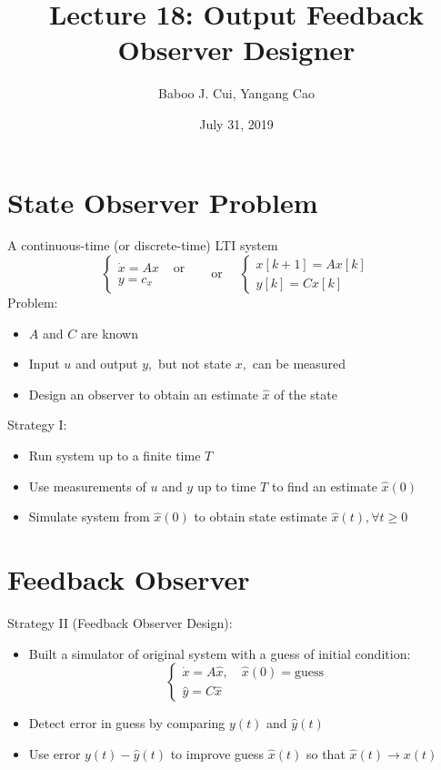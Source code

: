 \documentclass[10pt,a4paper,oneside]{article}
\date{July 31, 2019}
\author{Baboo J. Cui, Yangang Cao}
\title{Lecture 18: Output Feedback Observer Designer}
\begin{document}
\maketitle
\tableofcontents
\newpage
\section{State Observer Problem}
A continuous-time (or discrete-time) LTI system
\[
\left\{\begin{array}{ll}{\dot{x}=A x} & {\text { or }} \\ {y=c_{x}}\end{array} \quad \text { or } \quad\left\{\begin{array}{l}{x[k+1]=A x[k]} \\ {y[k]=C x[k]}\end{array}\right.\right.
\]
Problem:
\begin{itemize}
\item $A$ and $C$ are known
\item Input $u$ and output $y,$ but not state $x,$ can be measured
\item Design an observer to obtain an estimate $\hat{x}$ of the state
\end{itemize}
Strategy I:
\begin{itemize}
\item Run system up to a finite time $T$
\item Use measurements of $u$ and $y$ up to time $T$ to find an estimate $\hat{x}(0)$
\item Simulate system from $\hat{x}(0)$ to obtain state estimate $\hat{x}(t), \forall t \geq 0$
\end{itemize}
\section{Feedback Observer}
Strategy II (Feedback Observer Design):
\begin{itemize}	
\item Built a simulator of original system with a guess of initial condition:
\[
\left\{\begin{array}{l}{\dot{x}=A \hat{x}},\quad\hat{x}(0)=\text{guess}  \\ {\hat{y}=C \hat{x}}\end{array}\right.
\]
\item Detect error in guess by comparing $y(t)$ and $\hat{y}(t)$
\item Use error $y(t)-\hat{y}(t)$ to improve guess $\hat{x}(t)$ so that $\hat{x}(t) \rightarrow x(t)$
\end{itemize}
\end{document}
